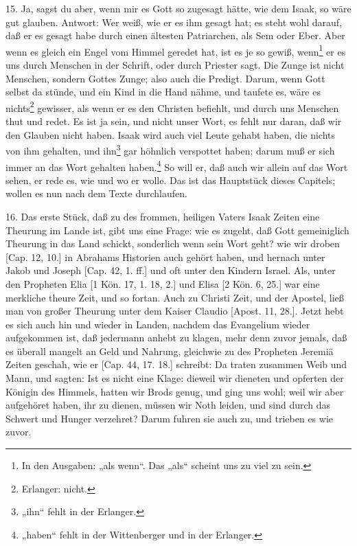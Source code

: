 15. Ja, sagst du aber, wenn mir es Gott so zugesagt hätte, wie dem Isaak, so wäre gut glauben. Antwort: Wer weiß, wie er es ihm gesagt hat; es steht wohl darauf, daß er es gesagt habe durch einen ältesten Patriarchen, als Sem oder Eber. Aber wenn es gleich ein Engel vom Himmel geredet hat, ist es je so gewiß, wenn\footnote{In den Ausgaben: „als wenn“. Das „als“ scheint uns zu viel zu sein.} er es uns durch Menschen in der Schrift,
oder durch Priester sagt. Die Zunge ist nicht Menschen, sondern Gottes Zunge; also auch die Predigt. Darum, wenn Gott selbst da stünde, und ein Kind in die Hand nähme, und taufete es, wäre es nichts\footnote{Erlanger: nicht.} gewisser, als wenn er es den Christen befiehlt, und durch uns Menschen thut und redet. Es ist ja sein, und nicht unser Wort, es fehlt nur daran, daß wir den Glauben nicht haben. Isaak wird auch viel Leute gehabt haben, die nichts von ihm gehalten, und ihn\footnote{„ihn“ fehlt in der Erlanger.} gar höhnlich verspottet haben; darum muß er sich immer an das Wort gehalten haben.\footnote{„haben“ fehlt in der Wittenberger und in der Erlanger.} So will er, daß auch wir allein auf das Wort sehen, er rede es, wie und wo er wolle. Das ist das Hauptstück dieses Capitels; wollen es nun nach dem Texte durchlaufen.

16. Das erste Stück, daß zu des frommen, heiligen Vaters Isaak Zeiten eine Theurung im Lande ist, gibt uns eine Frage: wie es zugeht, daß Gott gemeiniglich Theurung in das Land schickt, sonderlich wenn sein Wort geht? wie wir droben [Cap. 12, 10.] in Abrahams Historien auch gehört haben, und hernach unter Jakob und Joseph [Cap. 42, 1. ff.] und oft unter den Kindern Israel. Als, unter den Propheten Elia [1 Kön. 17, 1. 18, 2.] und Elisa [2 Kön. 6, 25.] war eine merkliche theure Zeit, und so fortan. Auch zu Christi Zeit, und der Apostel, ließ man von großer Theurung unter dem Kaiser Claudio [Apost. 11, 28.]. Jetzt hebt es sich auch hin und wieder in Landen, nachdem das Evangelium wieder aufgekommen ist, daß jedermann anhebt zu klagen, mehr denn zuvor jemals, daß es überall mangelt an Geld und Nahrung, gleichwie zu des Propheten Jeremiä Zeiten geschah, wie er [Cap. 44, 17. 18.] schreibt: Da traten zusammen Weib und Mann, und sagten: Ist es nicht eine Klage: dieweil wir dieneten und opferten der Königin des Himmels, hatten wir Brods genug, und ging uns wohl; weil wir aber aufgehöret haben, ihr zu dienen, müssen wir Noth leiden, und sind durch das Schwert und Hunger verzehret? Darum fuhren sie auch zu, und trieben es wie zuvor.

